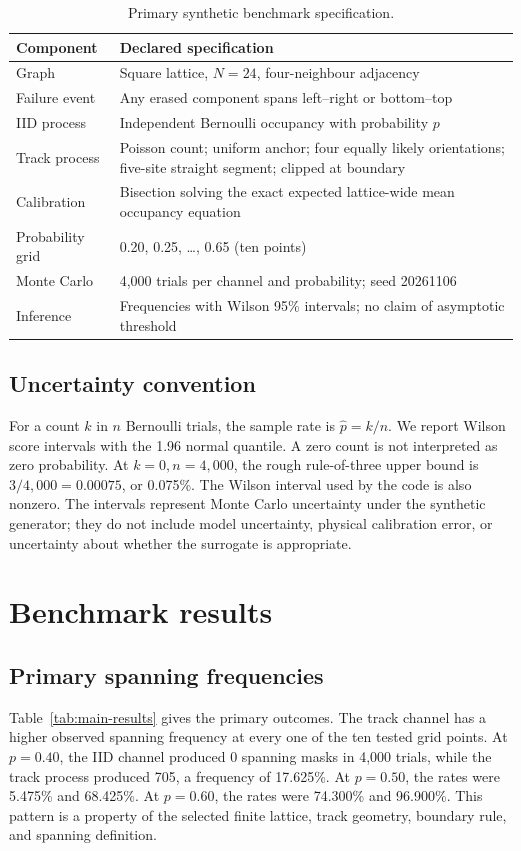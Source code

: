 \documentclass[11pt,a4paper,oneside]{article}
\begin{document}
\begin{table}[t]\centering\small\caption{Primary synthetic benchmark specification.}\label{tab:benchmark-spec}\begin{tabularx}{\linewidth}{p{.29\linewidth}X}\toprule
Component & Declared specification\\\midrule
Graph & Square lattice, \(N=24\), four-neighbour adjacency\\
Failure event & Any erased component spans left--right or bottom--top\\
IID process & Independent Bernoulli occupancy with probability \(p\)\\
Track process & Poisson count; uniform anchor; four equally likely orientations; five-site straight segment; clipped at boundary\\
Calibration & Bisection solving the exact expected lattice-wide mean occupancy equation\\
Probability grid & 0.20, 0.25, \ldots, 0.65 (ten points)\\
Monte Carlo & 4,000 trials per channel and probability; seed 20261106\\
Inference & Frequencies with Wilson 95\% intervals; no claim of asymptotic threshold\\\bottomrule\end{tabularx}\end{table}

\subsection{Uncertainty convention}
For a count \(k\) in \(n\) Bernoulli trials, the sample rate is \(\hat p=k/n\). We report Wilson score intervals with the 1.96 normal quantile. A zero count is not interpreted as zero probability. At \(k=0,n=4,000\), the rough rule-of-three upper bound is \(3/4,000=0.00075\), or 0.075\%. The Wilson interval used by the code is also nonzero. The intervals represent Monte Carlo uncertainty under the synthetic generator; they do not include model uncertainty, physical calibration error, or uncertainty about whether the surrogate is appropriate.

\section{Benchmark results}
\label{sec:results}
\subsection{Primary spanning frequencies}
Table~\ref{tab:main-results} gives the primary outcomes. The track channel has a higher observed spanning frequency at every one of the ten tested grid points. At \(p=0.40\), the IID channel produced 0 spanning masks in 4,000 trials, while the track process produced 705, a frequency of 17.625\%. At \(p=0.50\), the rates were 5.475\% and 68.425\%. At \(p=0.60\), the rates were 74.300\% and 96.900\%. This pattern is a property of the selected finite lattice, track geometry, boundary rule, and spanning definition.
\end{document}
